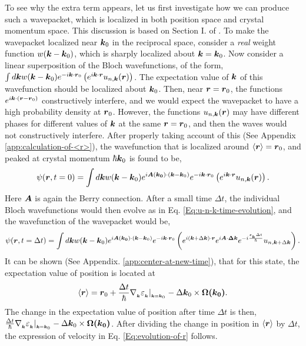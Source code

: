 \documentclass{report}
\renewcommand\vec[1]{\ensuremath\boldsymbol{#1}} %
\begin{document}
To see why the extra term appears, let us first investigate how we can produce such a wavepacket, which is localized in both position space and crystal momentum space. This discussion is based on Section I. of \cite{ralph2020berry}. To make the wavepacket localized near $\vec{k}_0$ in the reciprocal space, consider a \textit{real} weight function $w(\vec{k} - \vec{k}_0)$, which is sharply localized about $\vec{k} = \vec{k}_0$. Now consider a linear superposition of the Bloch wavefunctions, of the form, $\int d\vec{k} w(\vec{k} - \vec{k}_0) e^{-i \vec{k} \cdot \vec{r}_0 } \left(e^{i \vec{k} \cdot\vec{r}} u_{n,\vec{k}}(\vec{r})\right)$. The expectation value of $\vec{k}$ of this wavefunction should be localized about $\vec{k}_0$. Then, near $\vec{r} = \vec{r}_0$, the functions $e^{i \vec{k} \cdot (\vec{r} -\vec{r}_0 )}$ constructively interfere, and we would expect the wavepacket to have a high probability density at $\vec{r}_0$. However, the functions $u_{n,\vec{k}}(\vec{r})$ may have different phases for different values of $\vec{k}$ at the same $\vec{r} = \vec{r}_0$, and then the waves would not constructively interfere.
After properly taking account of this (See Appendix \ref{app:calculation-of-<r>}), the wavefunction that is localized around $\expval{\vec{r}} = \vec{r}_0$, and peaked at crystal momentum $\hbar \vec{k}_0$ is found to be,
\begin{equation}\label{Eq:wavefunction-wavepacket}
	\psi(\vec{r}, t=0) = \int d\vec{k} w(\vec{k} - \vec{k}_0) e^{i \vec{A}(\vec{k_0})\cdot (\vec{k} - \vec{k}_0)} e^{-i \vec{k} \cdot \vec{r}_0 } \left(e^{i \vec{k} \cdot\vec{r}} u_{n,\vec{k}}(\vec{r})\right).
\end{equation}
Here $\vec{A}$ is again the Berry connection. After a small time $\Delta t$, the individual Bloch wavefunctions would then evolve as in Eq. \eqref{Eq:u-n-k-time-evolution}, and the wavefunction of the wavepacket would be,
$$\psi(\vec{r}, t=\Delta t) = \int d\vec{k} w(\vec{k} - \vec{k}_0) e^{i \vec{A}(\vec{k_0})\cdot (\vec{k} - \vec{k}_0)} e^{-i \vec{k} \cdot \vec{r}_0 } \left(e^{i (\vec{k} + \Delta\vec{k})\cdot\vec{r}} e^{i \vec{A}\cdot \vec{\Delta{k}}} e^{-i \frac{\varepsilon_{_{\vec{k}}} \Delta t}{\hbar}} u_{n, \vec{k}+\Delta \vec{k}} \right).$$
It can be shown (See Appendix. \ref{app:center-at-new-time}), that for this state, the expectation value of position is located at
$$\langle \vec{r} \rangle = \vec{r}_0 +  \frac{\Delta t}{\hbar} \nabla{_{_{\vec{k}}}} \varepsilon_{_{\vec{k}}}|_{_{\vec{k} = \vec{k}_0}} - \Delta \vec{k}_0 \times \vec{\Omega(\vec{k}_0)}.$$
The change in the expectation value of position after time $\Delta t$ is then, $\frac{\Delta t}{\hbar} \nabla{_{_{\vec{k}}}} \varepsilon_{_{\vec{k}}}|_{_{\vec{k} = \vec{k}_0}} - \Delta \vec{k}_0 \times \vec{\Omega(\vec{k}_0)}$. After dividing the change in position in $\langle{\vec{r}}\rangle$ by $\Delta t$, the expression of velocity in Eq. \eqref{Eq:evolution-of-r} follows.
\end{document}
